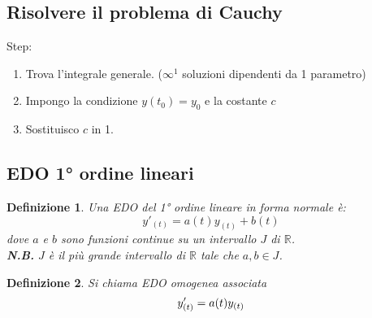 \documentclass{scrreprt}
\newtheorem{defn}{Definizione}
\newenvironment{definition}{\begin{mdframed}[backgroundcolor=Ivory2]\begin{defn}}{\end{defn}\end{mdframed}}
\begin{document}
\subsection{Risolvere il problema di Cauchy}
Step:
\begin{enumerate}
	\item Trova l'integrale generale. ($\infty^1$ soluzioni dipendenti da 1 parametro)
	\item Impongo la condizione $y(t_{0})=y_{0}$ e la costante $c$
	\item Sostituisco $c$ in 1.
\end{enumerate}

\subsection{EDO 1° ordine lineari}
\begin{definition}
	Una EDO del 1° ordine lineare in forma normale è:\\
	\begin{equation}
		y'_{(t)} = a(t)y_{(t)} + b(t)
	\end{equation}
	dove $a$ e $b$ sono funzioni continue su un intervallo $J$ di $\mathbb{R}$.\\
	\textbf{N.B.} $J$ è il più grande intervallo di $\mathbb{R}$ tale che $a,b\in J$.\\
\end{definition}

\begin{definition}
	Si chiama EDO omogenea associata
	\begin{equation}
		y'_{(t)} = a(t)y_{(t)}\\
	\end{equation}
\end{definition}

\end{document}
